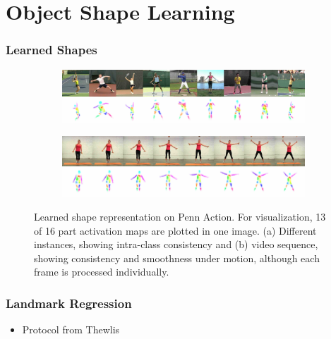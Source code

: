 \section{Object Shape Learning}
	\begin{frame}
	\frametitle{Learned Shapes}
		\begin{figure}[htp]
			\begin{subfigure}{1.\textwidth}
			\centering
			\includegraphics[trim={0cm 0cm 0cm 0cm},clip, width=1.\linewidth]{fig/shape/shape8white}\caption{}
			\label{fig:shape_penn}
			\end{subfigure}
			\begin{subfigure}{1.\textwidth}
			\centering
			\includegraphics[trim={0cm 0cm 0cm 0cm},clip, width=1.\linewidth]{fig//shape/shape_yoga8}\caption{}
			\label{fig:shape_tennis}
			\end{subfigure}
			\caption{Learned shape representation on Penn Action. For visualization, 13 of 16 part activation maps are plotted in one image. (a) Different instances, showing intra-class consistency and (b) video sequence, showing consistency and smoothness under motion, although each frame is processed individually.}
			\label{fig:shape}
		\end{figure}
	\end{frame}

	\begin{frame}
	\frametitle{Landmark Regression}
		\begin{itemize}
			\item Protocol from Thewlis
		\end{itemize}
	\end{frame}

